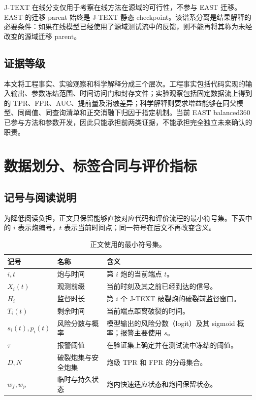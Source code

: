 \documentclass[11pt,a4paper]{article}
\begin{document}
J-TEXT 在线分支仅用于考察在线方法在源域的可行性，不参与 EAST 迁移。EAST 的迁移 parent 始终是 J-TEXT 静态 checkpoint。该谱系分离是结果解释的必要条件：如果在线模型已经使用了源域测试流中的反馈，则不能再将其称为未经改变的源域迁移 parent。

\subsection{证据等级}

本文将工程事实、实验观察和科学解释分成三个层次。工程事实包括代码实现的输入输出、参数冻结范围、时间访问门和封存文件；实验观察包括固定数据流上得到的 TPR、FPR、AUC、提前量及消融差异；科学解释则要求增益能够在同父模型、同阈值、同查询清单和正交消融下归因于指定机制。当前 EAST balanced360 已参与方法和参数开发，因此只能承担前两类证据，不能承担完全独立未来确认的职责。

\section{数据划分、标签合同与评价指标}

\subsection{记号与阅读说明}

为降低阅读负担，正文只保留能够直接对应代码和评价流程的最小符号集。下表中的 \(i\) 表示炮编号，\(t\) 表示当前时间点；同一符号在后文不再改变含义。

\begin{table}[H]
\centering
\caption{正文使用的最小符号集。}
\small
\begin{tabularx}{\textwidth}{C{16mm} l Y}
\toprule
记号 & 名称 & 含义\\
\midrule
\(i,t\) & 炮与时间 & 第 \(i\) 炮的当前端点 \(t\)。\\
\(X_i(t)\) & 观测前缀 & 当前时刻及其之前已经到达的信号。\\
\(H_i\) & 监督时长 & 第 \(i\) 个 J-TEXT 破裂炮的破裂前监督窗口。\\
\(T_i(t)\) & 剩余时间 & 当前端点距离破裂的时间。\\
\(s_i(t),p_i(t)\) & 风险分数与概率 & 模型输出的风险分数（logit）及其 sigmoid 概率；报警主要使用 \(s\)。\\
\(\tau\) & 报警阈值 & 在验证集上确定并在测试流中冻结的阈值。\\
\(D,N\) & 破裂炮集与安全炮集 & 炮级 TPR 和 FPR 的分母集合。\\
\(w_f,w_p\) & 临时与持久状态 & 炮内快速适应状态和炮间保留状态。\\
\bottomrule
\end{tabularx}
\end{table}
\end{document}
